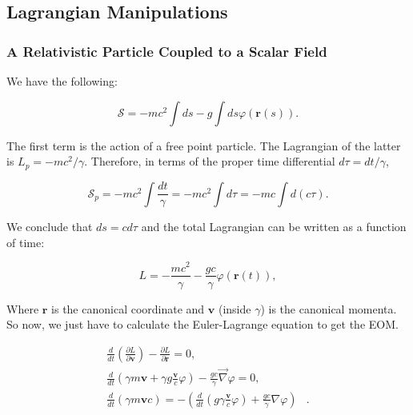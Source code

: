 
\subsection{Lagrangian Manipulations}

\newcommand{\matL}{\mathcal{L}}
\newcommand{\pu}[1]{\partial^{#1 }}
\newcommand{\pd}[1]{\partial_{#1 }}
\newcommand{\metu}[1]{\eta^{#1 }}
\newcommand{\metd}[1]{\eta_{#1 }}
\newcommand{\deltita}[2]{\delta^{#1 }_{#2}}
\newcommand{\vad}[1]{A_{#1 }}
\newcommand{\vau}[1]{A^{#1 }}

\subsubsection{A Relativistic Particle Coupled to a Scalar Field}\label{A Relativistic Particle Coupled to a Scalar Field}

We have the following:

\begin{equation}
	\mathcal{S}=-m c^{2} \int d s-g \int d s \varphi(\mathbf{r}(s)).
\end{equation}

The first term  is the action of a free point particle. The Lagrangian of the latter is $L_{p}=-m c^{2} / \gamma$. Therefore, in terms of the proper time differential $d \tau=d t / \gamma$,

\begin{equation}
	\mathcal{S}_{p}=-m c^{2} \int \frac{d t}{\gamma}=-m c^{2} \int d \tau=-m c \int d(c \tau).
\end{equation}

We conclude that $ds=c d \tau$ and  the total Lagrangian can be written as a function of time:

\begin{equation}
	L=-\frac{m c^{2}}{\gamma}-\frac{g c}{\gamma} \varphi(\mathbf{r}(t)),
\end{equation}

Where $\textbf{r}$ is the canonical coordinate and $\textbf{v}$ (inside $\gamma$) is the canonical momenta. So now, we just have to calculate the Euler-Lagrange equation to get the EOM.

\begin{equation}
	\begin{split}
		\frac{d}{d t} \left(\frac{\partial L}{\partial \mathbf{v}}\right)-\frac{\partial L}{\partial \mathbf{r}}=0,&\\
		\frac{d}{d t}\left(\gamma m \mathbf{v}+\gamma g \frac{\mathbf{v}}{c} \varphi \right) - \frac{gc}{\gamma} \vec{\nabla} \varphi=0,&\\
		\frac{d}{d t} (\gamma m \mathbf{v} c)=-\left(\frac{d}{d t}\left(g \gamma \frac{\mathbf{v}}{c} \varphi\right)+\frac{g c}{\gamma} \nabla \varphi\right)&.
	\end{split}
\end{equation}

